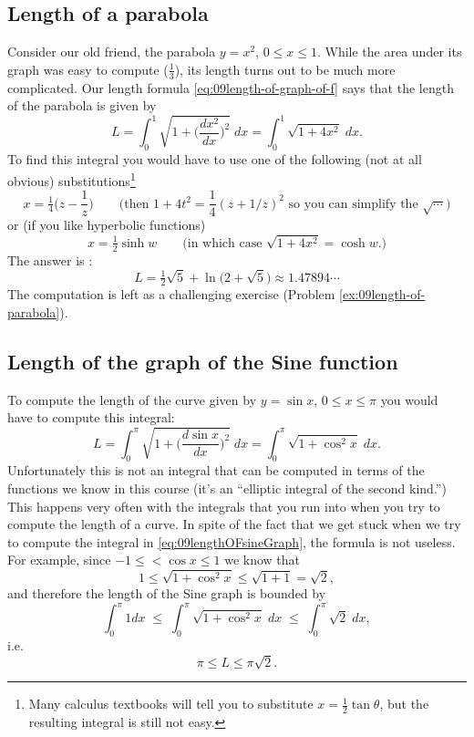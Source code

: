 \subsection{Length of a parabola}
Consider our old friend, the parabola $y=x^2$, $0\leq x\leq 1$.  While the area
under its graph was easy to compute ($\frac13$), its length turns out to be much
more complicated.
%
Our length formula \eqref{eq:09length-of-graph-of-f} says that the length of the
parabola is given by
\begin{equation}
  L = \int_0^1 \sqrt{1+\bigl(\frac{dx^2}{dx}\bigr)^2}\;dx =\int_0^1
  \sqrt{1+4x^2}\;dx.
  \label{eq:09length-of-parabola}
\end{equation}
To find this integral you would have to use one of the following (not at all
obvious) substitutions\footnote{Many calculus textbooks will tell you to
substitute $x = \frac12\tan\theta$, but the resulting integral is still not
easy. }
\begin{equation}
  x=\tfrac14\bigl(z-\frac1z\bigr)\qquad
  \text{(then $1+4t^2 =\frac14(z+1/z)^2 $ so
  you can simplify the $\sqrt{\cdots}$)}
  \label{eq:09rationalizing-substitution}
\end{equation}
or (if you like hyperbolic functions)
\[
  x = \tfrac12\sinh w\qquad \text{(in which case $\sqrt{1+4x^2} = \cosh w$.)}
\]
The answer is :
\[
  L = \tfrac12 \sqrt{5} + \ln\bigl(2+\sqrt{5}\bigr) \approx 1.47894\cdots
\]
The computation is left as a challenging exercise (Problem
\ref{ex:09length-of-parabola}).

\subsection{Length of the graph of the Sine function}
To compute the length of the curve given by $y=\sin x$, $0\leq x\leq \pi$ you
would have to compute this integral:
\begin{equation}\label{eq:09lengthOFsineGraph}
  L
  = \int_0^\pi \sqrt{1+\bigl(\frac{d\sin x}{dx}\bigr)^2}\; dx
  = \int_0^\pi \sqrt{1+\cos^2 x}\; dx.
\end{equation}%
\marginpar{}%
Unfortunately this is not an integral that can be computed in terms of the
functions we know in this course (it's an ``elliptic integral of the second
kind.'')  This happens very often with the integrals that you run into when you
try to compute the length of a curve.  In spite of the fact that we get stuck
when we try to compute the integral in \eqref{eq:09lengthOFsineGraph}, the
formula is not useless.  For example, since $-1\leq <\cos x\leq 1$ we know that
\[
  1\leq \sqrt{1+\cos ^2 x} \leq \sqrt{1+1} = \sqrt2,
\]
and therefore the length of the Sine graph is bounded by
\[
  \int_0^\pi 1dx \;\leq\; \int_0^\pi \sqrt{1+\cos^2 x}\; dx \;\leq\;
  \int_0^\pi\sqrt2\;dx,
\]
i.e.
\[
  \pi \leq L \leq \pi\sqrt2.
\]

